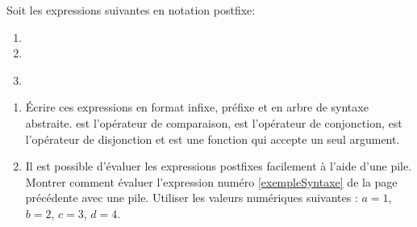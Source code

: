 \begin{Exercise}
\label{ex:postfixe}
Soit les expressions suivantes en notation postfixe:
\begin{enumerate}
\item {}
\item {}
\item \label{exempleSyntaxe}
\end{enumerate}

\begin{enumerate}
\item Écrire ces expressions en format infixe, préfixe et en arbre de
  syntaxe abstraite. \codeinline{==} est l'opérateur de comparaison,
  \codeinline{&&} est l'opérateur de conjonction, \codeinline{||} est
  l'opérateur de disjonction et  est une fonction qui
  accepte un seul argument.


\item
Il est possible d'évaluer les expressions postfixes facilement à
l'aide d'une pile. Montrer comment évaluer l'expression numéro
\ref{exempleSyntaxe} de la page précédente avec une pile. Utiliser les
valeurs numériques suivantes : $a = 1$, $b = 2$, $c = 3$, $d = 4$.
\end{enumerate}
\end{Exercise}

